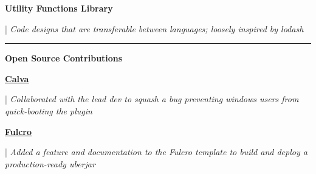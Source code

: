 \documentclass[letterpaper,11pt]{article}
\begin{document}
\begin{minipage}[t]{0.28\textwidth}
	\raggedright
	\textbf{ Utility Functions Library } \\
\end{minipage}
\hfill
\begin{minipage}[t]{0.70\textwidth}
	\raggedright
	|\textit{ Code designs that are transferable between languages; loosely inspired by lodash } \\
\end{minipage}
\noindent\rule{19.5cm}{0.4pt}

\textbf{\large \textcolor{magic_blue}{Open Source Contributions}}

\begin{minipage}[t]{0.08\textwidth}
	\raggedright
	\href{https://github.com/BetterThanTomorrow/calva/issues/2325}{ \underline{\textbf{Calva}}} \\
\end{minipage}
\hfill
\begin{minipage}[t]{0.90\textwidth}
	\raggedright
	|\textit{ Collaborated with the lead dev to squash a bug preventing windows users from quick-booting the plugin } \\
\end{minipage}

\begin{minipage}[t]{0.08\textwidth}
	\raggedright
	\href{https://github.com/fulcrologic/fulcro-template/pull/28}{ \underline{\textbf{Fulcro}}} \\
\end{minipage}
\hfill
\begin{minipage}[t]{0.90\textwidth}
	\raggedright
	|\textit{ Added a feature and documentation to the Fulcro template to build and deploy a production-ready uberjar } \\
\end{minipage}

\end{document}
